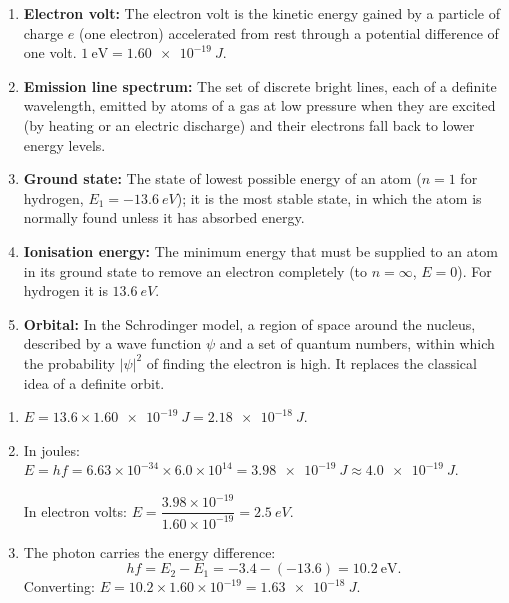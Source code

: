 \documentclass[11pt]{article}
\begin{document}
\begin{corrige}
\begin{enumerate}
\item \textbf{Electron volt:} The electron volt is the kinetic energy gained by a particle of charge $e$ (one electron) accelerated from rest through a potential difference of one volt. $1\ \mathrm{eV} = \SI{1.60e-19}{J}$.
\item \textbf{Emission line spectrum:} The set of discrete bright lines, each of a definite wavelength, emitted by atoms of a gas at low pressure when they are excited (by heating or an electric discharge) and their electrons fall back to lower energy levels.
\item \textbf{Ground state:} The state of lowest possible energy of an atom ($n = 1$ for hydrogen, $E_1 = \SI{-13.6}{eV}$); it is the most stable state, in which the atom is normally found unless it has absorbed energy.
\item \textbf{Ionisation energy:} The minimum energy that must be supplied to an atom in its ground state to remove an electron completely (to $n = \infty$, $E = 0$). For hydrogen it is $\SI{13.6}{eV}$.
\item \textbf{Orbital:} In the Schrodinger model, a region of space around the nucleus, described by a wave function $\psi$ and a set of quantum numbers, within which the probability $|\psi|^{2}$ of finding the electron is high. It replaces the classical idea of a definite orbit.
\end{enumerate}
\end{corrige}

\begin{corrige}
\begin{enumerate}
\item $E = 13.6 \times \SI{1.60e-19}{J} = \boxed{\SI{2.18e-18}{J}}$.
\item In joules: $E = hf = 6.63\times 10^{-34} \times 6.0\times 10^{14} = \boxed{\SI{3.98e-19}{J}} \approx \SI{4.0e-19}{J}$.

In electron volts: $E = \dfrac{3.98\times 10^{-19}}{1.60\times 10^{-19}} = \boxed{\SI{2.5}{eV}}$.
\item The photon carries the energy difference:
\[ hf = E_2 - E_1 = -3.4 - (-13.6) = 10.2\ \mathrm{eV}. \]
Converting: $E = 10.2 \times 1.60\times 10^{-19} = \boxed{\SI{1.63e-18}{J}}$.
\end{enumerate}
\end{corrige}
\end{document}
